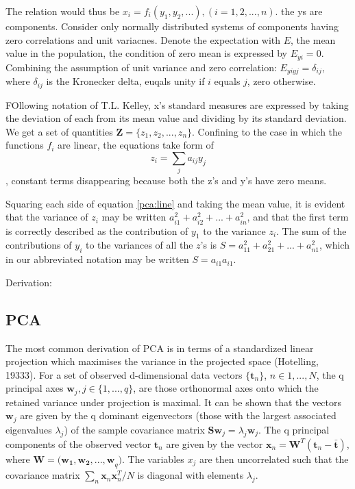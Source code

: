\documentclass[ %
                    author={Dillon Keith Diep},
                supervisor={Dr. Carl Henrik Ek},
                    degree={MEng},
                     title={Assisted Content Generation for 3D Hair Geometry},
                  subtitle={[INCOMPLETE DRAFT, CONTAINS NOTES FROM RESEARCH]},
                      type={Research},
                      year={2014} ]{dissertation}
\begin{document}
The relation would thus be $x_i=f_i(y_1,y_2,...), (i=1,2,...,n)$.
the ys are components.
Consider only normally distributed systems of components having zero correlations and unit variacnes.
Denote the expectation with $E$, the mean value in the population, the condition of zero mean is expressed by $E_{yi}=0$.
Combining the assumption of unit variance and zero correlation: $E_{yiyj}=\delta_{ij}$, where $\delta_{ij}$ is the Kronecker delta, euqals unity if $i$ equals $j$, zero otherwise.

FOllowing notation of T.L. Kelley, x's standard measures are expressed by taking the deviation of each from its mean value and dividing by its standard deviation. We get a set of quantities $\mathbf{Z}=\{z_1,z_2,...,z_n\}$. Confining to the case in which the functions $f_i$ are linear, the equations take form of 
\begin{equation} \label{pca:line}
z_i=\sum_ja_{ij}y_j
\end{equation}
, constant terms disappearing because both the z's and y's have zero means.

Squaring each side of equation \ref{pca:line} and taking the mean value, it is evident that the variance of $z_i$ may be written $a^2_{i1}+a^2_{i2}+...+a^2_{in}$, and that the first term is correctly described as the contribution of $y_1$ to the variance $z_i$. The sum of the contributions of $y_i$ to the variances of all the $z$'s is $S = a^2_{11}+a^2_{21}+...+a^2_{n1}$, which in our abbreviated notation may be written $S=a_{i1}a_{i1}$.


Derivation: 

\subsection{PCA}
The most common derivation of PCA is in terms of a standardized linear projection which maximises the variance in the projected space (Hotelling, 19333). For a set of observed d-dimensional data vectors $\{\mathbf{t}_n\}$, $n\in {1,...,N}$, the q principal axes $\mathbf{w}_j, j\in \{1,...,q\}$, are those orthonormal axes onto which the retained variance under projection is maximal. It can be shown that the vectors $\mathbf{w}_j$ are given by the q dominant eigenvectors (those with the largest associated eigenvalues $\lambda_j$) of the sample covariance matrix $\mathbf{Sw}_j=\lambda_j\mathbf{w}_j$. The q principal components of the observed vector $\mathbf{t}_n$ are given by the vector $\mathbf{x}_n=\mathbf{W}^T(\mathbf{t}_n-\mathbf{\bar{t}})$, where $\mathbf{W=(w_1,w_2,...,w}_q)$. The variables $x_j$ are then uncorrelated such that the covariance matrix $\sum_n\mathbf{x}_n\mathbf{x}^T_n /N$ is diagonal with elements $\lambda_j$.
\end{document}
